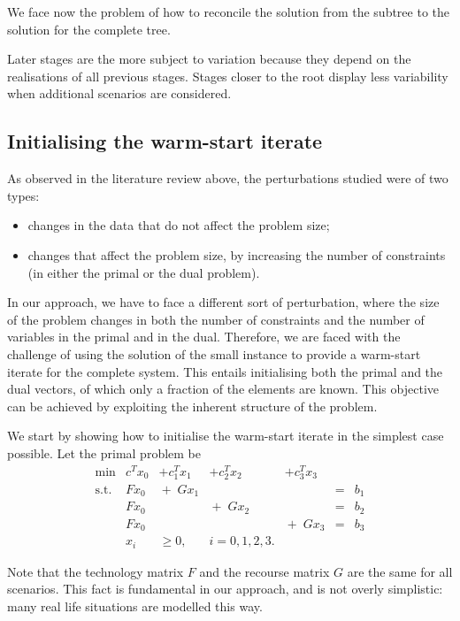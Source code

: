 We face now the problem of how to reconcile the solution from 
the subtree to the solution for the complete tree.

\hrulefill

Later stages are the more subject to variation because they 
depend on the realisations of all previous stages. Stages 
closer to the root display less variability when additional 
scenarios are considered.

%
%
\subsection{Initialising the warm-start iterate}

As observed in the literature review above, the perturbations 
studied were of two types:
\begin{itemize}
\item changes in the data that do not affect the problem size;
\item changes that affect the problem size, by increasing the 
number of constraints (in either the primal or the dual problem).
\end{itemize}

In our approach, we have to face a different sort of 
perturbation, where the size of the problem changes in both 
the number of constraints and the number of variables in the 
primal and in the dual. Therefore, we are faced with the 
challenge of using the solution of the small instance to 
provide a warm-start iterate for the complete system. This 
entails initialising both the primal and the dual vectors, of 
which only a fraction of the elements are known. This objective 
can be achieved by exploiting the inherent structure of the problem.

We start by showing how to initialise the warm-start iterate 
in the simplest case possible. Let the primal problem be
\[
\begin{array}{rllllll}
  \min & c^T x_0 &+ c_1^Tx_1 &+ c_2^Tx_2 &+ c_3^Tx_3 \\
  \mbox{s.t.} & Fx_0 &   \!\!\! + \; Gx_1 &&& = & b_1 \\
              & Fx_0 &&  \!\!\! + \; Gx_2 &&  = & b_2 \\
              & Fx_0 &&& \!\!\! + \; Gx_3 &   = & b_3 \\
              & x_i &\ge 0, &i = 0, 1, 2, 3.
\end{array}
\]

Note that the technology matrix $F$ and the recourse matrix 
$G$ are the same for all scenarios. This fact is fundamental 
in our approach, and is not overly simplistic: many real life 
situations are modelled this way. 

